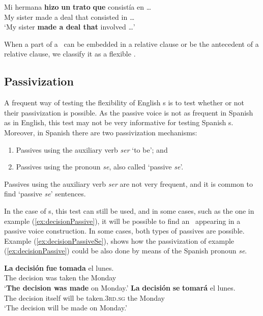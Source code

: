 \documentclass[output=paper]{langsci/langscibook}
\begin{document}
\begin{exe}
\ex \label{ex:tratoSubordinate2}
\gll Mi hermana \textbf{hizo} \textbf{un} \textbf{trato} \textbf{que} consistía en \ldots\\
My sister made a deal that consisted in \ldots\\
\glt `My sister \textbf{made a deal that} involved \ldots'
\end{exe}

When a part of a \mwe\ can be embedded in a relative clause or be the antecedent of a relative clause, we classify it as a flexible \mwe. 

\subsection{Passivization}
\label{ssec:passivization}

A frequent way of testing the flexibility of English \mwe s is to test whether or not their passivization is possible.
As the passive voice is not as frequent in Spanish as in English, this test may not be very informative for testing Spanish \mwe s.
Moreover, in Spanish there are two passivization mechanisms:

\begin{enumerate}
\item Passives using the auxiliary verb \textit{ser} `to be'; and
\item Passives using the pronoun \textit{se}, also called `passive \textit{se}'.
\end{enumerate}

Passives using the auxiliary verb \textit{ser} are not very frequent, and it is common to find `passive \textit{se}' sentences.

In the case of \mwe s, this test can still be used, and in some cases, such as the one in example (\ref{ex:decisionPassive}), it will be possible to find an \mwe\ appearing in a passive voice construction.
In some cases, both types of passives are possible.
Example (\ref{ex:decisionPassiveSe}), shows how the passivization of example (\ref{ex:decisionPassive}) could be also done by means of the Spanish pronoun \textit{se}.

\begin{exe}
\ex \label{ex:decisionPassive}
\gll \textbf{La} \textbf{decisión} \textbf{fue} \textbf{tomada} el lunes. \\
The decision was taken the Monday\\
\glt `\textbf{The decision was made} on Monday.'
\ex \label{ex:decisionPassiveSe}
\gll \textbf{La} \textbf{decisión} \textbf{se} \textbf{tomará} el lunes. \\
The decision itself {will be taken.\textsc{3rd.sg}} the Monday\\
\glt `The decision will be made on Monday.'
\end{exe}
\end{document}
